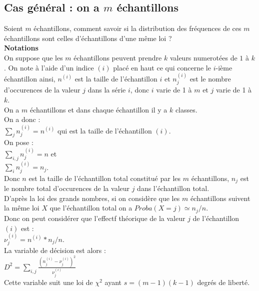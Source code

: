 \documentclass[a4paper,11pt]{book}
\begin{document}
\subsection{Cas g\'en\'eral : on a $m$ \'echantillons}\label{sec:notation}
Soient $m$ \'echantillons, comment savoir si la distribution des fr\'equences
 de ces $m$ \'echantillons sont celles d'\'echantillons d'une m\^eme loi ?\\
{\bf Notations}\\
On suppose que les $m$ \'echantillons peuvent prendre $k$ valeurs numerot\'ees
 de $1$ \`a $k$.
On note \`a l'aide d'un indice $(i)$ plac\'e en haut ce qui concerne le 
$i$-i\`eme \'echantillon ainsi, 
$n^{(i)}$ est la taille de l'\'echantillon  $i$ et $n_j^{(i)}$ est le nombre 
d'occurences de la valeur $j$ dans la s\'erie $i$, donc $i$ varie de 1 \`a $m$ et $j$ varie de 
1 \`a $k$. \\
On a $m$ \'echantillons et dans chaque \'echantillon il y a $k$ classes.\\
On a donc :\\
$\displaystyle \sum_j n_j^{(i)} =n^{(i)}$ qui est la taille de l'\'echantillon 
$(i)$.\\
On pose : \\
$\displaystyle \sum_{i,j} n_j^{(i)} =n$ et \\
$\displaystyle \sum_{i} n_j^{(i)} =n_j$.\\
Donc $n$ est la taille de l'\'echantillon  total constitu\'e par les $m$ 
\'echantillons,
 $n_j$ est le nombre total d'occurences de la valeur $j$ dans l'\'echantillon 
total.\\
 D'apr\`es la loi des grands nombres, si on consid\`ere que les $m$
 \'echantillons suivent la m\^eme loi $X$ que l'\'echantillon  total on a 
$Proba(X=j) \simeq n_j/n$.\\
Donc on peut consid\'erer que l'effectf 
th\'eorique de la valeur $j$ de l'\'echantillon $(i)$ est :\\
$\nu_j^{(i)}=n^{(i)}*n_j/n$.\\
 La variable de d\'ecision est alors :\\
$\displaystyle D^2=\sum_{i,j}\frac{(n_j^{(i)}-\nu_j^{(i)})^2}{\nu_j^{(i)}}$\\
Cette variable suit une loi de $\chi^2$ ayant $s=(m-1)(k-1)$ degr\'es de 
libert\'e.
    
\end{document}
